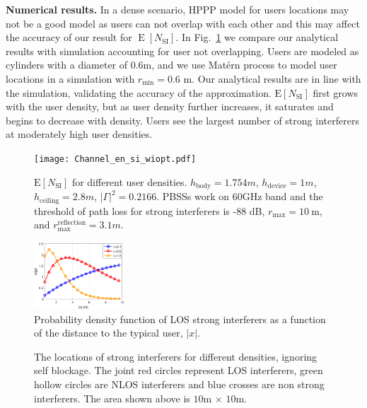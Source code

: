 \documentclass[10pt, conference, letterpaper]{IEEEtran}
\newcommand*{\Rom}[1]{\uppercase\expandafter{\romannumeral #1\relax}} %
\DeclareMathOperator*{\E}{\mathrm{E}}
\begin{document}
\textbf{Numerical results.}
In a dense scenario, HPPP model for users locations may not be a good model as users can not overlap with each other and this may affect the accuracy of our result for $\E[N_{\mathrm{SI}}]$.
In Fig.~\ref{fig:channel:en_si} we compare our analytical results with simulation accounting for user not overlapping.
Users are modeled as cylinders with a diameter of 0.6m, and we use Mat\'ern \Rom{3} process \cite{matern} to model user locations in a simulation with $r_{\min}=0.6$ m.
Our analytical results are in line with the simulation, validating the accuracy of the approximation. 
$\mathrm{E}[N_{\mathrm{SI}}]$ first grows with the user density, but as user density further increases, it saturates and begins to decrease with density.
Users see the largest number of strong interferers at moderately high user densities. 


\begin{figure}
	\centering
	\texttt{[image: Channel\_en\_si\_wiopt.pdf]}
	\caption{$\mathrm{E}[N_{\mathrm{SI}}]$ for different user densities. $h_{\mathrm{body}} = 1.754m$,  $h_{\mathrm{device}}= 1m$, $h_{\mathrm{ceiling}}=2.8m$, $|\Gamma|^2 = 0.2166$.
		PBSSs work on 60GHz band and the threshold of path loss for strong interferers is -88 dB, $r_{\max} = 10\mathrm{~m}$, and $r_{\max}^{\mathrm{reflection}} = 3.1m$.}
	\label{fig:channel:en_si}
\end{figure}


\begin{figure}
	\centering
	\includegraphics[width = 0.3\textwidth]{Channel_si_pdf.pdf}
	\caption{Probability density function of LOS strong interferers as a function of the distance to the typical user, $|x|$.}
	\label{fig:Channel_si_pdf}
\end{figure}

\begin{figure}[htp]	
	\centering
	 \hfill
	 \hfill
	\caption{The locations of strong interferers for different densities, ignoring self blockage. The joint red circles represent LOS interferers, green hollow circles are NLOS interferers and blue crosses are non strong interferers. The area shown above is $10$m $\times$ $10$m.}
	\label{fig:channel:jamming}
\end{figure}
\end{document}
